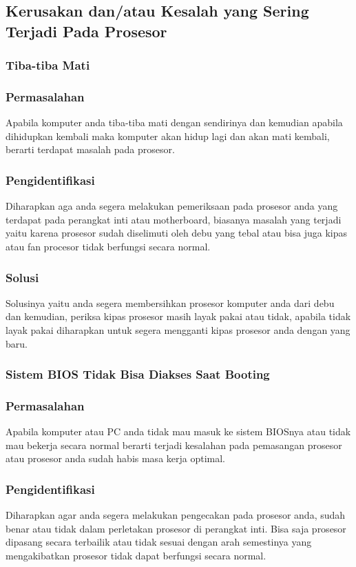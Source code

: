 \subsection{Kerusakan dan/atau Kesalah yang Sering Terjadi Pada Prosesor}

\subsubsection{Tiba-tiba Mati}
	\subsubsection{Permasalahan}
Apabila komputer anda tiba-tiba mati dengan sendirinya dan kemudian apabila dihidupkan kembali maka komputer akan hidup lagi dan akan
mati kembali, berarti terdapat masalah pada prosesor.
	\subsubsection{Pengidentifikasi}
Diharapkan aga anda segera melakukan pemeriksaan pada prosesor anda yang terdapat pada perangkat inti atau motherboard, biasanya
masalah yang terjadi yaitu karena prosesor sudah diselimuti oleh debu yang tebal atau bisa juga kipas atau fan procesor tidak
berfungsi secara normal.
	\subsubsection{Solusi}
Solusinya yaitu anda segera membersihkan prosesor komputer anda dari debu dan kemudian, periksa kipas prosesor masih layak pakai
atau tidak, apabila tidak layak pakai diharapkan untuk segera mengganti kipas prosesor anda dengan yang baru.

\subsubsection{Sistem BIOS Tidak Bisa Diakses Saat Booting}
	\subsubsection{Permasalahan}
Apabila komputer atau PC anda tidak mau masuk ke sistem BIOSnya atau tidak mau bekerja secara normal berarti terjadi kesalahan pada
pemasangan prosesor atau prosesor anda sudah habis masa kerja optimal.
	\subsubsection{Pengidentifikasi}
Diharapkan agar anda segera melakukan pengecakan pada prosesor anda, sudah benar atau tidak dalam perletakan prosesor di perangkat
inti. Bisa saja prosesor dipasang secara terbailik atau tidak sesuai dengan arah semestinya yang mengakibatkan prosesor tidak dapat
berfungsi secara normal.
